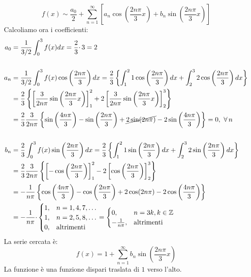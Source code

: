 \begin{equation*}
f( x) \sim \frac{a_{0}}{2} +\sum\limits ^{\infty }_{n=1}\left[ a_{n}\cos\left(\frac{2n\pi }{3} x\right) +b_{n}\sin\left(\frac{2n\pi }{3} x\right)\right]
\end{equation*}
Calcoliamo ora i coefficienti:
\begin{align*}
a_{0} & =\frac{1}{3/2}\int ^{3}_{0} f(x)dx=\frac{2}{3} \cdotp 3=2\\
 & \\
a_{n} & =\frac{1}{3/2}\int ^{3}_{0} f(x)\cos\left(\frac{2n\pi }{3}\right) dx=\frac{2}{3}\left\{\int ^{2}_{1} 1\cos\left(\frac{2n\pi }{3}\right) dx+\int ^{3}_{2} 2\cos\left(\frac{2n\pi }{3}\right) dx\right\}\\
 & =\frac{2}{3}\left\{\left[\frac{3}{2n\pi }\sin\left(\frac{2n\pi }{3} x\right)\right]^{2}_{1} +2\left[\frac{3}{2n\pi }\sin\left(\frac{2n\pi }{3} x\right)\right]^{3}_{2}\right\}\\
 & =\frac{2}{3}\frac{3}{2n\pi }\left\{\sin\left(\frac{4n\pi }{3}\right) -\sin\left(\frac{2n\pi }{3}\right) +\cancel{2\sin( 2n\pi )} -2\sin\left(\frac{4n\pi }{3}\right)\right\} =0,\ \forall n\\
 & \\
b_{n} & =\frac{2}{3}\int ^{3}_{0} f(x)\sin\left(\frac{2n\pi }{3}\right) dx=\frac{2}{3}\left\{\int ^{2}_{1} 1\sin\left(\frac{2n\pi }{3}\right) dx+\int ^{3}_{2} 2\sin\left(\frac{2n\pi }{3}\right) dx\right\}\\
 & =\frac{2}{3}\frac{3}{2n\pi }\left\{\left[ -\cos\left(\frac{2n\pi }{3}\right)\right]^{2}_{1} -2\left[\cos\left(\frac{2n\pi }{3}\right)\right]^{3}_{2}\right\}\\
 & =-\frac{1}{n\pi }\left\{\cos\left(\frac{4n\pi }{3}\right) -\cos\left(\frac{2n\pi }{3}\right) +2\cos( 2n\pi ) -2\cos\left(\frac{4n\pi }{3}\right)\right\}\\
 & =-\frac{1}{n\pi } \cdotp \begin{cases}
1, & n=1,4,7,\dotsc \\
1, & n=2,5,8,\dotsc \\
0, & \text{altrimenti}
\end{cases} =\begin{cases}
0, & n=3k,k\in \mathbb{Z}\\
-\frac{1}{n\pi } , & \text{altrimenti}
\end{cases}
\end{align*}
La serie cercata è:
\begin{equation*}
f(x)=1+\sum ^{\infty }_{n=1} b_{n}\sin\left(\frac{2n\pi }{3} x\right)
\end{equation*}
La funzione è una funzione dispari traslata di $1$ verso l'alto.
\Soluzione

